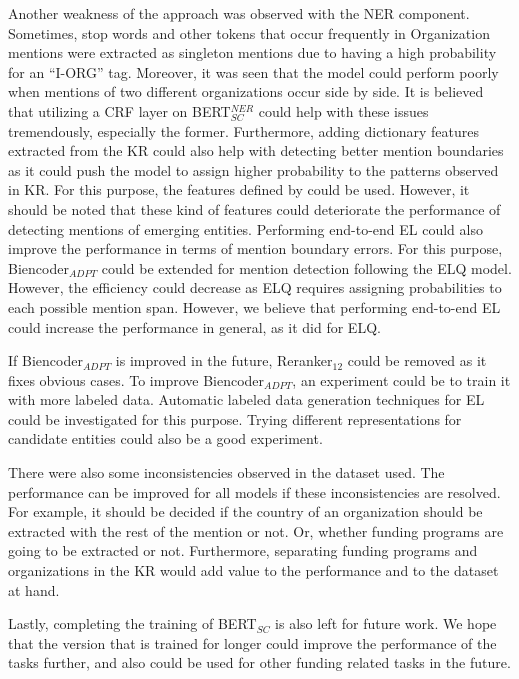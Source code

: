 \documentclass{report}
\theoremstyle{definition}
\theoremstyle{remark}
\begin{document}
Another weakness of the approach was observed with the NER component. Sometimes, stop words and other tokens that occur frequently in Organization mentions were extracted as singleton mentions due to having a high probability for an ``I-ORG'' tag. Moreover, it was seen that the model could perform poorly when mentions of two different organizations occur side by side. It is believed that utilizing a CRF layer on BERT$^{NER}_{SC}$ could help with these issues tremendously, especially the former. Furthermore, adding dictionary features extracted from the KR could also help with detecting better mention boundaries as it could push the model to assign higher probability to the patterns observed in KR. For this purpose, the features defined by \cite{MedDict} could be used. However, it should be noted that these kind of features could deteriorate the performance of detecting mentions of emerging entities. Performing end-to-end EL could also improve the performance in terms of mention boundary errors. For this purpose, Biencoder$_{ADPT}$ could be extended for mention detection following the ELQ model. However, the efficiency could decrease as ELQ requires assigning probabilities to each possible mention span. However, we believe that performing end-to-end EL could increase the performance in general, as it did for ELQ.

If Biencoder$_{ADPT}$ is improved in the future, Reranker$_{12}$ could be removed as it fixes obvious cases. To improve Biencoder$_{ADPT}$, an experiment could be to train it with more labeled data. Automatic labeled data generation techniques for EL could be investigated for this purpose. Trying different representations for candidate entities could also be a good experiment.

There were also some inconsistencies observed in the dataset used. The performance can be improved for all models if these inconsistencies are resolved. For example, it should be decided if the country of an organization should be extracted with the rest of the mention or not. Or, whether funding programs are going to be extracted or not. Furthermore, separating funding programs and organizations in the KR would add value to the performance and to the dataset at hand.

Lastly, completing the training of BERT$_{SC}$ is also left for future work. We hope that the version that is trained for longer could improve the performance of the tasks further, and also could be used for other funding related tasks in the future.
\end{document}
